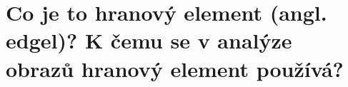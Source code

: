 \section{Co je to hranový element (angl. edgel)? K čemu se v analýze obrazů hranový element používá?}